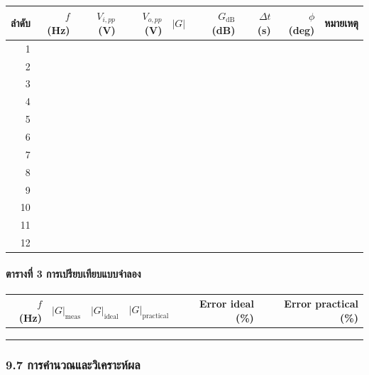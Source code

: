 \begin{table}[htbp]
    \centering
    \begin{tabular}{r r r r r r r r l}
        \hline
        \textbf{ลำดับ} & \textbf{$f$ (Hz)} & \textbf{$V_{i,pp}$ (V)} & \textbf{$V_{o,pp}$ (V)} & \textbf{$|G|$} & \textbf{$G_{\text{dB}}$ (dB)} & \textbf{$\Delta t$ (s)} & \textbf{$\phi$ (deg)} & \textbf{หมายเหตุ} \\
        \hline
        1 &  &  &  &  &  &  &  &  \\
        2 &  &  &  &  &  &  &  &  \\
        3 &  &  &  &  &  &  &  &  \\
        4 &  &  &  &  &  &  &  &  \\
        5 &  &  &  &  &  &  &  &  \\
        6 &  &  &  &  &  &  &  &  \\
        7 &  &  &  &  &  &  &  &  \\
        8 &  &  &  &  &  &  &  &  \\
        9 &  &  &  &  &  &  &  &  \\
        10 &  &  &  &  &  &  &  &  \\
        11 &  &  &  &  &  &  &  &  \\
        12 &  &  &  &  &  &  &  &  \\
        \hline
    \end{tabular}
\end{table}

\paragraph{ตารางที่ 3 การเปรียบเทียบแบบจำลอง}

\begin{table}[htbp]
    \centering
    \begin{tabular}{r r r r r r}
        \hline
        \textbf{$f$ (Hz)} & \textbf{$|G|_{\text{meas}}$} & \textbf{$|G|_{\text{ideal}}$} & \textbf{$|G|_{\text{practical}}$} & \textbf{Error ideal (\%)} & \textbf{Error practical (\%)} \\
        \hline
         &  &  &  &  &  \\
         &  &  &  &  &  \\
         &  &  &  &  &  \\
        \hline
    \end{tabular}
\end{table}

\subsubsection{9.7 การคำนวณและวิเคราะห์ผล}

